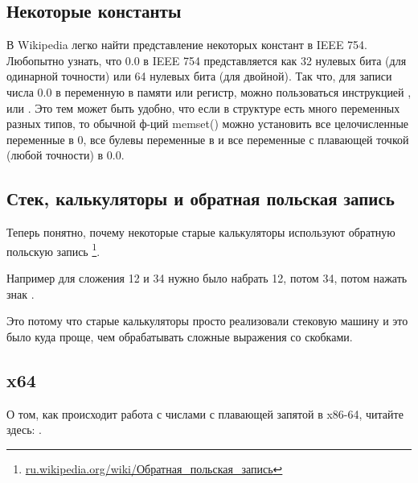 \subsection{Некоторые константы}

В Wikipedia легко найти представление некоторых констант в IEEE 754.
Любопытно узнать, что 0.0 в IEEE 754 представляется как 32 нулевых бита (для одинарной точности) или 64 нулевых бита
(для двойной).
Так что, для записи числа 0.0 в переменную в памяти или регистр, можно пользоваться инструкцией \MOV, или .
Это тем может быть удобно, что если в структуре есть много переменных разных типов, то обычной ф-ций memset()
можно установить все целочисленные переменные в 0, все булевы переменные в 
и все переменные с плавающей точкой (любой точности) в 0.0.

\subsection{Стек, калькуляторы и обратная польская запись}

Теперь понятно, почему некоторые старые калькуляторы используют обратную польскую запись
\footnote{\href{http://go.yurichev.com/17355}{ru.wikipedia.org/wiki/Обратная\_польская\_запись}}.

Например для сложения 12 и 34 нужно было набрать 12, потом 34, потом нажать знак .

Это потому что старые калькуляторы просто реализовали стековую машину и это было куда проще, чем обрабатывать сложные выражения со скобками.

\subsection{x64}

О том, как происходит работа с числами с плавающей запятой в x86-64, читайте здесь: .



